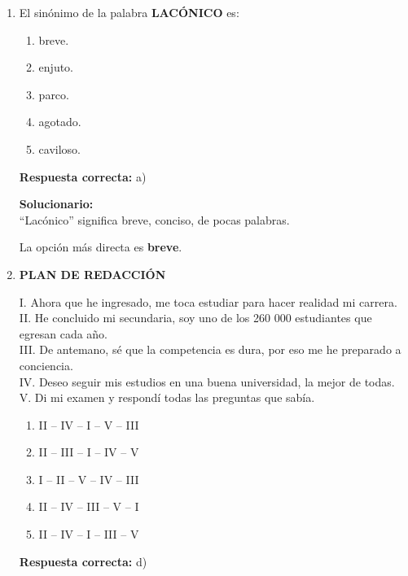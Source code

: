 \begin{enumerate}
	\vspace{2mm}
	\textbf{Solucionario:}\\
	``Alevosía'' se relaciona con traición o perfidia; su antónimo es \textbf{lealtad}.
	

	
	\vspace{6mm}
	
	\item El sinónimo de la palabra \textbf{LACÓNICO} es:
	\begin{enumerate}[label=\alph*)]
		\item breve.
		\item enjuto.
		\item parco.
		\item agotado.
		\item caviloso.
	\end{enumerate}
	\textbf{Respuesta correcta:} a)
	
	\vspace{2mm}
	\textbf{Solucionario:}\\
	``Lacónico'' significa breve, conciso, de pocas palabras.
	
	La opción más directa es \textbf{breve}.
	

	
	\vspace{6mm}
	
	\item \textbf{PLAN DE REDACCIÓN}
	
	I. Ahora que he ingresado, me toca estudiar para hacer realidad mi carrera.\\
	II. He concluido mi secundaria, soy uno de los 260 000 estudiantes que egresan cada año.\\
	III. De antemano, sé que la competencia es dura, por eso me he preparado a conciencia.\\
	IV. Deseo seguir mis estudios en una buena universidad, la mejor de todas.\\
	V. Di mi examen y respondí todas las preguntas que sabía.
	
	\begin{enumerate}[label=\alph*)]
		\item II -- IV -- I -- V -- III
		\item II -- III -- I -- IV -- V
		\item I -- II -- V -- IV -- III
		\item II -- IV -- III -- V -- I
		\item II -- IV -- I -- III -- V
	\end{enumerate}
	\textbf{Respuesta correcta:} d)
	

\end{enumerate}
